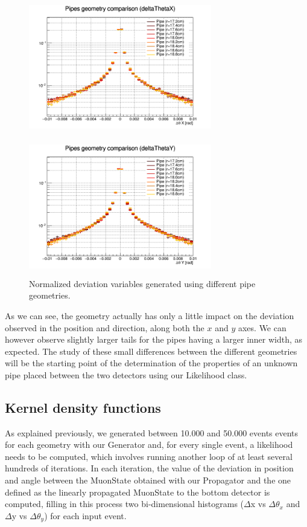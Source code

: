 \documentclass[a4paper, 11pt]{report}
\begin{document}
\begin{figure}[htbp]
 {
\begin{minipage}[b]{.49\textwidth}
\includegraphics[width=8cm, height=6cm]{figs/deltaThetaX.png}
\end{minipage}\hfill
\begin{minipage}[b]{.49\textwidth}
\includegraphics[width=8cm, height=6cm]{figs/deltaThetaY.png}
\end{minipage} \hfill
}
\caption{Normalized deviation variables generated using different pipe geometries.}
\label{fig:gemComp}
\end{figure}

As we can see, the geometry actually has only a little impact on the deviation observed in the position and direction, along both the $x$ and $y$ axes. We can however observe slightly larger tails for the pipes having a larger inner width, as expected. The study of these small differences between the different geometries will be the starting point of the determination of the properties of an unknown pipe placed between the two detectors using our Likelihood class.

\subsection{Kernel density functions}

As explained previously, we generated between 10.000 and 50.000 events events for each geometry with our Generator and, for every single event, a likelihood needs to be computed, which involves running another loop of at least several hundreds of iterations. In each iteration, the value of the deviation in position and angle between the MuonState obtained with our Propagator and the one defined as the linearly propagated MuonState to the bottom detector is computed, filling in this process two bi-dimensional histograms ($\Delta$x vs $\Delta \theta_x$ and $\Delta$y vs $\Delta \theta_y$) for each input event.
\end{document}
